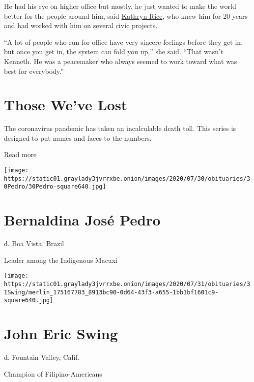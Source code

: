 He had his eye on higher office but mostly, he just wanted to make the
world better for the people around him, said
\href{https://www.facebookcorewwwi.onion/TheRiceReport/?ref=nf\&hc_ref=ARTAfj43umcC9a0YgYNFwAP0Vu6zu40LE-Cck2XEECe7ULkeo6efNe-3v7g758qJt-k}{Kathryn
Rice}, who knew him for 20 years and had worked with him on several
civic projects.

``A lot of people who run for office have very sincere feelings before
they get in, but once you get in, the system can fold you up,'' she
said. ``That wasn't Kenneth. He was a peacemaker who always seemed to
work toward what was best for everybody.''

\href{https://www.nytimes3xbfgragh.onion/interactive/2020/obituaries/people-died-coronavirus-obituaries.html?action=click\&pgtype=Article\&state=default\&region=BELOW_MAIN_CONTENT\&context=covid_obits_promo}{}

\hypertarget{those-weve-lost}{%
\section{Those We've Lost}\label{those-weve-lost}}

The coronavirus pandemic has taken an incalculable death toll. This
series is designed to put names and faces to the numbers.

Read more

\texttt{[image: https://static01.graylady3jvrrxbe.onion/images/2020/07/30/obituaries/30Pedro/30Pedro-square640.jpg]}

\hypertarget{bernaldina-josuxe9-pedro}{%
\section{Bernaldina José Pedro}\label{bernaldina-josuxe9-pedro}}

d. Boa Vista, Brazil

Leader among the Indigenous Macuxi

\texttt{[image: https://static01.graylady3jvrrxbe.onion/images/2020/07/31/obituaries/31Swing/merlin\_175167783\_8913bc90-0d64-43f3-a655-1bb1bf1601c9-square640.jpg]}

\hypertarget{john-eric-swing}{%
\section{John Eric Swing}\label{john-eric-swing}}

d. Fountain Valley, Calif.

Champion of Filipino-Americans

